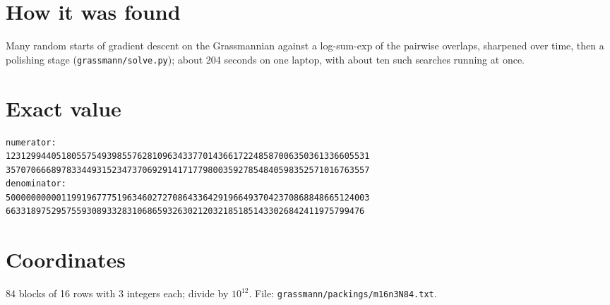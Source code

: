 \documentclass[11pt,a4paper]{article}
\begin{document}
\section{How it was found}
Many random starts of gradient descent on the Grassmannian against a log-sum-exp of the pairwise overlaps, sharpened over time, then a polishing stage (\texttt{grassmann/solve.py}); about 204 seconds on one laptop, with about ten such searches running at once.


\appendix
\section{Exact value}
{\small
\begin{verbatim}
numerator:
123129944051805575493985576281096343377014366172248587006350361336605531
357070666897833449315234737069291417177980035927854840598352571016763557
denominator:
500000000001199196777519634602727086433642919664937042370868848665124003
66331897529575593089332831068659326302120321851851433026842411975799476
\end{verbatim}}

\section{Coordinates}
84 blocks of 16 rows with 3 integers each; divide by $10^{12}$. File: \texttt{grassmann/packings/m16n3N84.txt}.
{\tiny
\begin{multicols}{3}
\end{multicols}}
\end{document}
